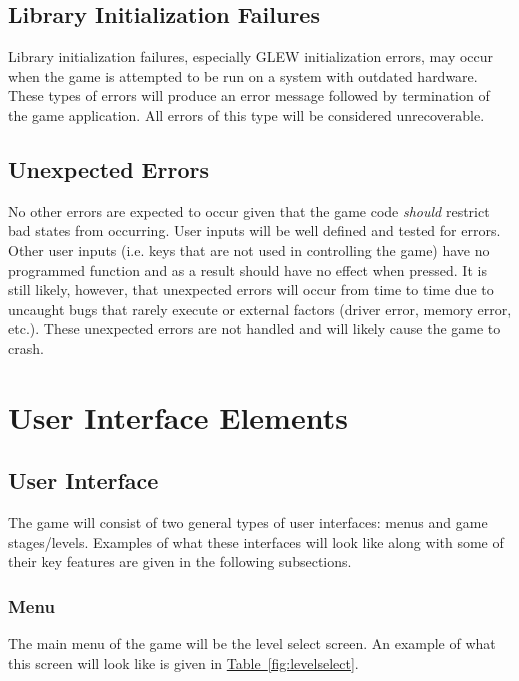 \documentclass[12pt, titlepage]{article}
\begin{document}
\subsection{Library Initialization Failures}
Library initialization failures, especially GLEW initialization errors, may occur when the game is attempted to be run on a system with outdated hardware.  These types of errors will produce an error message followed by termination of the game application.  All errors of this type will be considered unrecoverable.

\subsection{Unexpected Errors}
No other errors are expected to occur given that the game code \emph{should} restrict bad states from occurring.  User inputs will be well defined and tested for errors.  Other user inputs (i.e. keys that are not used in controlling the game) have no programmed function and as a result should have no effect when pressed.  It is still likely, however, that unexpected errors will occur from time to time due to uncaught bugs that rarely execute or external factors (driver error, memory error, etc.).  These unexpected errors are not handled and will likely cause the game to crash.

\section{User Interface Elements}

\subsection{User Interface}
The game will consist of two general types of user interfaces:  menus and game stages/levels.  Examples of what these interfaces will look like along with some of their key features are given in the following subsections.

\subsubsection{Menu}
The main menu of the game will be the level select screen.  An example of what this screen will look like is given in  \hyperref[fig:levelselect]{Table~\ref*{fig:levelselect}}.

\newpage
\end{document}
